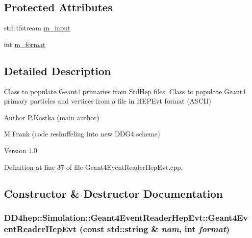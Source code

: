 \subsection*{Protected Attributes}
\begin{DoxyCompactItemize}
\item 
std::ifstream \hyperlink{class_d_d4hep_1_1_simulation_1_1_geant4_event_reader_hep_evt_ac65db88522c8b307f04ae3ec193fbcb5}{m\_\-input}
\item 
int \hyperlink{class_d_d4hep_1_1_simulation_1_1_geant4_event_reader_hep_evt_a7d4105611f4277b52394d78aae4de38e}{m\_\-format}
\end{DoxyCompactItemize}


\subsection{Detailed Description}
Class to populate Geant4 primaries from StdHep files. Class to populate Geant4 primary particles and vertices from a file in HEPEvt format (ASCII)

\begin{DoxyAuthor}{Author}
P.Kostka (main author) 

M.Frank (code reshuffeling into new DDG4 scheme) 
\end{DoxyAuthor}
\begin{DoxyVersion}{Version}
1.0 
\end{DoxyVersion}


Definition at line 37 of file Geant4EventReaderHepEvt.cpp.

\subsection{Constructor \& Destructor Documentation}
\hypertarget{class_d_d4hep_1_1_simulation_1_1_geant4_event_reader_hep_evt_a9f54306f8cbb584efb6a1e1e511d6f1e}{
\subsubsection[{Geant4EventReaderHepEvt}]{\setlength{\rightskip}{0pt plus 5cm}DD4hep::Simulation::Geant4EventReaderHepEvt::Geant4EventReaderHepEvt (const std::string \& {\em nam}, \/  int {\em format})}}
\label{class_d_d4hep_1_1_simulation_1_1_geant4_event_reader_hep_evt_a9f54306f8cbb584efb6a1e1e511d6f1e}


